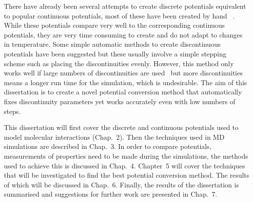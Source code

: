 \documentclass[12pt]{UoAthesis} \usepackage{booktabs}
\begin{document}
There have already been several attempts to create discrete potentials
equivalent to popular continuous potentials, most of these have been
created by hand~\cite{Chapela1989, ElliotJr2002, Unlu2004} .  While
these potentials compare very well to the corresponding continuous
potentials, they are very time consuming to create and do not adapt to
changes in temperature.  Some simple automatic methods to create
discontinuous potentials have been suggested but these usually involve
a simple stepping scheme such as placing the discontinuities evenly.
However, this method only works well if large numbers of
discontinuities are used~\cite{Chapela2010} but more discontinuities
means a longer run time for the simulation, which is undesirable.  The
aim of this dissertation is to create a novel potential conversion
method that automatically fixes discontinuity parameters yet works
accurately even with low numbers of steps. %

This dissertation will first cover the discrete and continuous
potentials used to model molecular interactions (Chap.~2).  Then the
techniques used in MD simulations are described in Chap.~3.  In order
to compare potentials, measurements of properties need to be made
during the simulations, the methods used to achieve this is discussed
in Chap.~4.  Chapter~5 will cover the techniques that will be
investigated to find the best potential conversion method.  The
results of which will be discussed in Chap.~6.  Finally, the results
of the dissertation is summarised and suggestions for further
work are presented in Chap.~7.




%
%
%
%
\end{document}
